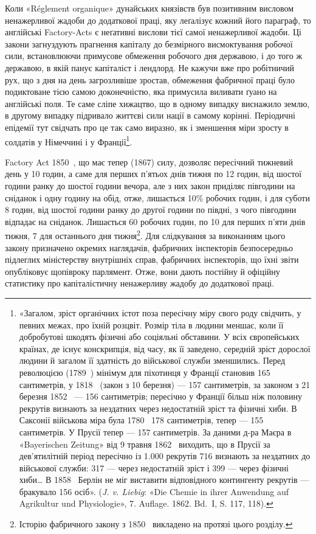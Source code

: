 Коли «Réglement organique» дунайських князівств був позитивним
висловом ненажерливої жадоби до додаткової праці, яку
леґалізує кожний його параграф, то англійські Factory-Acts
є неґативні вислови тієї самої ненажерливої жадоби. Ці закони
загнуздують прагнення капіталу до безмірного висмоктування
робочої сили, встановлюючи примусове обмеження робочого дня
державою, і до того ж державою, в якій панує капіталіст і лендлорд.
Не кажучи вже про робітничий рух, що з дня на день загрозливіше
зростав, обмеження фабричної праці було подиктоване
тією самою доконечністю, яка примусила виливати ґуано
на англійські поля. Те саме сліпе хижацтво, що в одному випадку
виснажило землю, в другому випадку підривало життєві сили
нації в самому корінні. Періодичні епідемії тут свідчать про це
так само виразно, як і зменшення міри зросту в солдатів у Німеччині
і у Франції\footnote{
«Загалом, зріст органічних істот поза пересічну міру свого роду
свідчить, у певних межах, про їхній розцвіт. Розмір тіла в людини меншає,
коли її добробутові шкодять фізичні або соціяльні обставини. У всіх європейських
країнах, де існує конскрипція, від часу, як її заведено, середній
зріст дорослої людини й загалом її здатність до військової служби зменшились.
Перед революцією (1789~) мінімум для піхотинця у Франції
становив 165 сантиметрів, у 1818~ (закон з 10 березня) — 157 сантиметрів,
за законом з 21 березня 1852~ — 156 сантиметрів; пересічно у Франції
більш ніж половину рекрутів визнають за нездатних через недостатній
зріст та фізичні хиби. В Саксонії військова міра була 1780~ 178 сантиметрів,
тепер — 155 сантиметрів. У Прусії тепер — 157 сантиметрів. За даними
д-ра Маєра в «Bayerischen Zeitung» від 9 травня 1862~ виходить,
що в Прусії за дев’ятилітній період пересічно із \num{1.000} рекрутів 716 визнають
за нездатних до військової служби: 317 — через недостатній зріст і
399 — через фізичні хиби\dots{} В 1858~ Берлін не міг виставити відповідного
контингенту рекрутів — бракувало 156 осіб». (\emph{J. v. Liebig}: «Die
Chemie in ihrer Anwendung auf Agrikultur und Physiologie», 7. Auflage.
1862. Bd.~I, S. 117, 118).
}.

Factory Act 1850~, що має тепер (1867) силу, дозволяє пересічний
тижневий день у 10 годин, а саме для перших п’ятьох
днів тижня по 12 годин, від шостої години ранку до шостої години
вечора, але з них закон приділяє півгодини на сніданок і
одну годину на обід, отже, лишається 10\% робочих годин, і для
суботи 8 годин, від шостої години ранку до другої години по
півдні, з чого півгодини відпадає на сніданок. Лишається 60 робочих
годин, по 10 для перших п’яти днів тижня, 7 для
останнього дня тижня\footnote{
Історію фабричного закону з 1850~ викладено на протязі цього
розділу.
}. Для слідкування за виконанням цього
закону призначено окремих наглядачів, фабричних інспекторів
безпосередньо підлеглих міністерству внутрішніх справ, фабричних
інспекторів, що їхні звіти опубліковує щопівроку парлямент.
Отже, вони дають постійну й офіційну статистику про капіталістичну
ненажерливу жадобу до додаткової праці.

